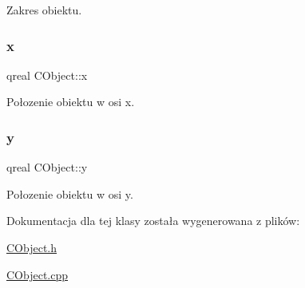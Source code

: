 Zakres obiektu. 

\mbox{\label{class_c_object_acb23178c7b65e6cf37f9ab95128cd8d2}} 
\subsubsection{\texorpdfstring{x}{x}}
{\footnotesize\ttfamily qreal C\+Object\+::x\hspace{0.3cm}{\ttfamily [protected]}}



Połozenie obiektu w osi x. 

\mbox{\label{class_c_object_a22fd03bdf2bc5c7058e4c2a9c9237c64}} 
\subsubsection{\texorpdfstring{y}{y}}
{\footnotesize\ttfamily qreal C\+Object\+::y\hspace{0.3cm}{\ttfamily [protected]}}



Połozenie obiektu w osi y. 



Dokumentacja dla tej klasy została wygenerowana z plików\+:\begin{DoxyCompactItemize}
\item 
\mbox{\hyperlink{_c_object_8h}{C\+Object.\+h}}\item 
\mbox{\hyperlink{_c_object_8cpp}{C\+Object.\+cpp}}\end{DoxyCompactItemize}

